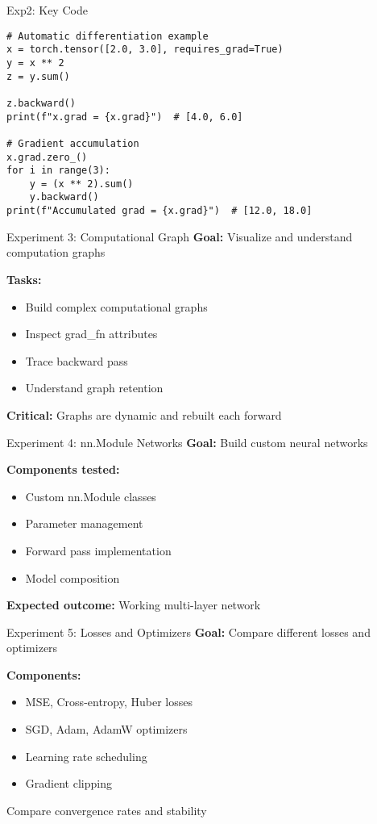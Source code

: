 \documentclass[aspectratio=169,10pt]{beamer}
\begin{document}
\begin{frame}[fragile]{Exp2: Key Code}
\begin{lstlisting}
# Automatic differentiation example
x = torch.tensor([2.0, 3.0], requires_grad=True)
y = x ** 2
z = y.sum()

z.backward()
print(f"x.grad = {x.grad}")  # [4.0, 6.0]

# Gradient accumulation
x.grad.zero_()
for i in range(3):
    y = (x ** 2).sum()
    y.backward()
print(f"Accumulated grad = {x.grad}")  # [12.0, 18.0]
\end{lstlisting}
\end{frame}

\begin{frame}{Experiment 3: Computational Graph}
\textbf{Goal:} Visualize and understand computation graphs

\textbf{Tasks:}
\begin{itemize}
    \item Build complex computational graphs
    \item Inspect grad\_fn attributes
    \item Trace backward pass
    \item Understand graph retention
\end{itemize}

\textbf{Critical:} Graphs are dynamic and rebuilt each forward
\end{frame}

\begin{frame}{Experiment 4: nn.Module Networks}
\textbf{Goal:} Build custom neural networks

\textbf{Components tested:}
\begin{itemize}
    \item Custom nn.Module classes
    \item Parameter management
    \item Forward pass implementation
    \item Model composition
\end{itemize}

\textbf{Expected outcome:} Working multi-layer network
\end{frame}

\begin{frame}{Experiment 5: Losses and Optimizers}
\textbf{Goal:} Compare different losses and optimizers

\textbf{Components:}
\begin{itemize}
    \item MSE, Cross-entropy, Huber losses
    \item SGD, Adam, AdamW optimizers
    \item Learning rate scheduling
    \item Gradient clipping
\end{itemize}

Compare convergence rates and stability
\end{frame}
\end{document}
